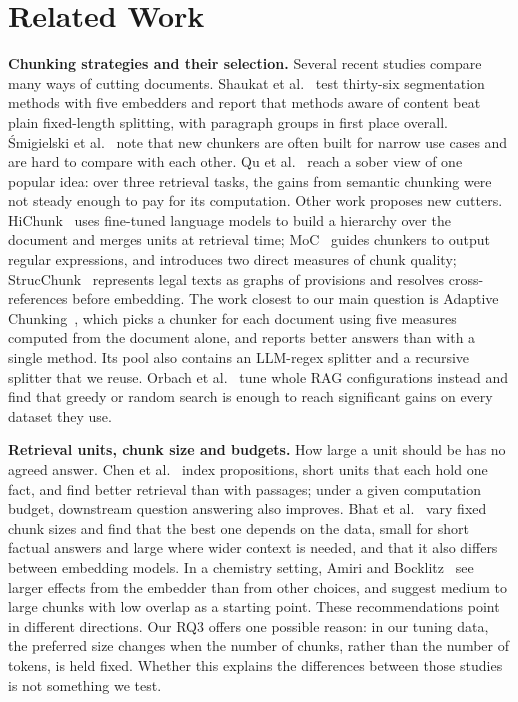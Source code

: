 \section{Related Work}\label{sec:related}

\textbf{Chunking strategies and their selection.} Several recent studies compare
many ways of cutting documents. Shaukat et al.~\cite{shaukat2026systematic}
test thirty-six segmentation methods with five embedders and report that methods
aware of content beat plain fixed-length splitting, with paragraph groups in
first place overall. \'Smigielski et al.~\cite{smigielski2026chunking} note that
new chunkers are often built for narrow use cases and are hard to compare with
each other. Qu et al.~\cite{qu2025semantic} reach a sober view of one popular
idea: over three retrieval tasks, the gains from semantic chunking were not
steady enough to pay for its computation. Other work proposes new cutters.
HiChunk~\cite{lu2025hichunk} uses fine-tuned language models to build a
hierarchy over the document and merges units at retrieval time;
MoC~\cite{zhao2025moc} guides chunkers to output regular expressions, and
introduces two direct measures of chunk quality; StrucChunk~\cite{singh2026strucchunk}
represents legal texts as graphs of provisions and resolves cross-references
before embedding. The work closest to our main question is Adaptive
Chunking~\cite{demourajunior2026adaptive}, which picks a chunker for each document
using five measures computed from the document alone, and reports better
answers than with a single method. Its pool also contains an LLM-regex splitter and a
recursive splitter that we reuse. Orbach et al.~\cite{orbach2025hpo} tune whole
RAG configurations instead and find that greedy or random search is enough
to reach significant gains on every dataset they use.

\textbf{Retrieval units, chunk size and budgets.} How large a unit should be
has no agreed answer. Chen et al.~\cite{chen2024densex} index propositions, short units that each
hold one fact, and find better retrieval than with passages; under a given computation budget, downstream
question answering also improves. Bhat et al.~\cite{bhat2025chunksize} vary
fixed chunk sizes and find that the best one depends on the data, small for
short factual answers and large where wider context is needed, and that it also
differs between embedding models. In a chemistry setting, Amiri and
Bocklitz~\cite{amiri2025chunk} see larger effects from the embedder than from
other choices, and suggest medium to large chunks with low overlap as a starting
point. These recommendations point in different directions. Our RQ3 offers one
possible reason: in our tuning data, the preferred size changes when the number of chunks,
rather than the number of tokens, is held fixed. Whether this explains the
differences between those studies is not something we test.

